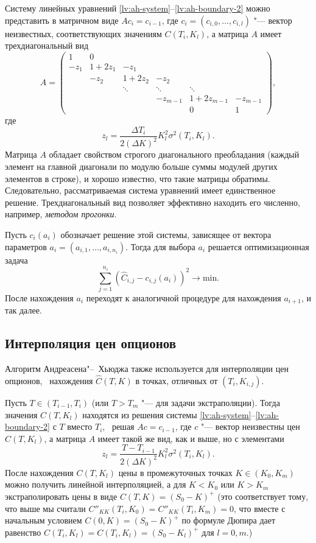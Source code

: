 Систему линейных уравнений \eqref{lv:ah-system}--\eqref{lv:ah-boundary-2} можно представить в матричном виде $A c_i = c_{i-1}$, где $c_i=(c_{i,0},\dots,c_{i,l})$ "--- вектор неизвестных, соответствующих значениям $C(T_i,K_l)$, а матрица $A$ имеет трехдиагональный вид
\[
A = \begin{pmatrix}
1 & 0 \\
-z_1 &1+2z_1 & -z_1\\
& -z_2 &1+2z_2 & -z_2\\
& & \ddots & \ddots & \ddots \\
& & & -z_{m-1} &1+2z_{m-1} & -z_{m-1}\\
& & & & 0 & 1
\end{pmatrix},
\]
где
\[
z_l = \frac{\Delta T_i}{2(\Delta K)^2} K_l^2\sigma^2(T_i,K_l).
\]
Матрица $A$ обладает свойством строгого диагонального преобладания (каждый элемент на главной диагонали по модулю больше суммы модулей других элементов в строке), и хорошо известно, что такие матрицы обратимы.
Следовательно, рассматриваемая система уравнений имеет единственное решение.
Трехдиагональный вид позволяет эффективно находить его численно, например, \emph{методом прогонки}.

Пусть $c_i(a_i)$ обозначает решение этой системы, зависящее от вектора параметров $a_i=(a_{i,1},\dots,a_{i,n_i})$. 
Тогда для выбора $a_i$ решается оптимизационная задача
\[
\sum_{j=1}^{n_i} (\hat C_{i,j} - c_{i,j}(a_i))^2 \to \text{min}.
\]
После нахождения $a_i$ переходят к аналогичной процедуре для нахождения $a_{i+1}$, и так далее.


\subsection{Интерполяция цен опционов}
Алгоритм Андреасена"--~Хьюджа также используется для интерполяции цен опционов, \te\ нахождения $\hat C(T,K)$ в точках, отличных от $(T_i,K_{i,j})$.

Пусть $T\in(T_{i-1},T_i)$ (или $T>T_m$ "--- для задачи экстраполяции).
Тогда значения $C(T,K_l)$ находятся из решения системы \eqref{lv:ah-system}--\eqref{lv:ah-boundary-2} с $T$ вместо $T_i$, \te\ решая $Ac = c_{i-1}$, где $c$ "--- вектор неизвестны цен $C(T,K_l)$, а матрица $A$ имеет такой же вид, как и выше, но с элементами
\[
z_l = \frac{T-T_{i-1}}{2(\Delta K)^2} K_l^2\sigma^2(T_i,K_l).
\]
После нахождения $C(T,K_l)$ цены в промежуточных точках $K\in (K_0,K_m)$ можно получить линейной интерполяцией, а для $K< K_0$ или $K>K_m$ экстраполировать цены в виде $C(T,K) = (S_0-K)^+$ (это соответствует тому, что выше мы считали $C''_{KK}(T_i,K_0) = C''_{KK}(T_i,K_m) = 0$, что вместе с начальным условием $C(0,K) = (S_0-K)^+$  по формуле Дюпира дает равенство $C(T_i,K_l) = C(T_i,K_l) = (S_0-K_l)^+$ для $l=0,m$.)


